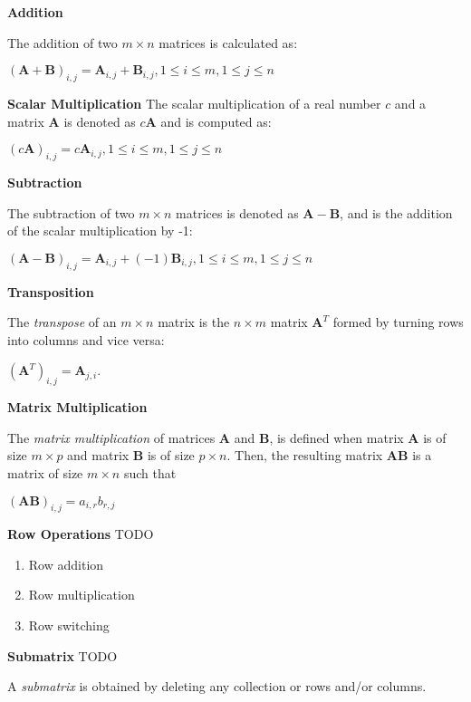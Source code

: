 \documentclass[12pt]{article}
\begin{document}
\medskip
\noindent\textbf{Addition}

\noindent The addition of two $m \times n$ matrices is calculated as:

$(\mathbf A + \mathbf B)_{i,j} = \mathbf{A}_{i,j} + \mathbf{B}_{i,j}, 1 \leq i \leq m, 1 \leq j \leq n$

\medskip
\noindent\textbf{Scalar Multiplication}
\noindent The scalar multiplication of a real number $c$ and a matrix $\mathbf{A}$ 
is denoted as $c\mathbf{A}$ and is computed as:

$(c\mathbf A)_{i,j} = c\mathbf{A}_{i,j}, 1 \leq i \leq m, 1 \leq j \leq n$

\medskip
\noindent\textbf{Subtraction}

\noindent The subtraction of two $m \times n$ matrices is denoted as $\mathbf{A} - \mathbf{B}$,
and is the addition of the scalar multiplication by -1:

$(\mathbf A - \mathbf B)_{i,j} = \mathbf{A}_{i,j} + (-1)\mathbf{B}_{i,j}, 1 \leq i \leq m, 1 \leq j \leq n$


\medskip
\noindent\textbf{Transposition}

\noindent The \textit{transpose} of an $m\times n$ matrix is the $n\times m$ matrix $\mathbf{A}^T$
formed by turning rows into columns and vice versa:

$(\mathbf A^T)_{i,j} = \mathbf A_{j,i}$.

\medskip
\noindent\textbf{Matrix Multiplication}

\noindent The \textit{matrix multiplication} of matrices $\mathbf A$ and $\mathbf B$, is 
defined when matrix $\mathbf A$ is of size $m \times p$ and matrix $\mathbf B$ is of 
size $p \times n$. Then, the resulting matrix $\mathbf A\mathbf B$ is a matrix of size 
$m \times n$ such that

$(\mathbf A\mathbf B)_{i,j} = a_{i,r}b_{r,j}$


\medskip
\noindent\textbf{Row Operations}
TODO

\begin{enumerate}
\item Row addition
\item Row multiplication
\item Row switching
\end{enumerate}


\medskip
\noindent\textbf{Submatrix}
TODO 

\noindent A \textit{submatrix} is obtained by deleting any collection or rows and/or columns.
\end{document}
